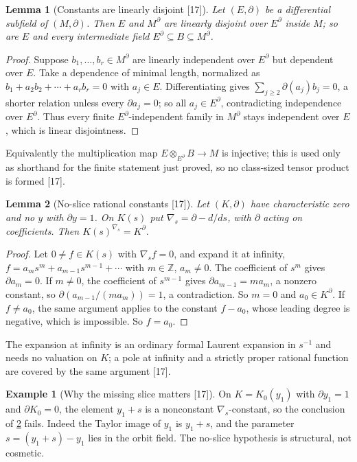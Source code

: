 \documentclass[11pt,oneside]{article}
\numberwithin{equation}{section}
\newtheorem{lemma}[lemma]{Lemma}
\theoremstyle{definition}
\newtheorem{example}[example]{Example}
\theoremstyle{remark}
\newcommand{\Z}{\mathbb Z}
\newcommand{\src}[1]{\textup{\textsf{\small[#1]}}}
\begin{document}
\begin{lemma}[Constants are linearly disjoint \src{17}]\label{opa:of:lem:LD}
Let $(E,\partial)$ be a differential subfield of $(M,\partial)$. Then $E$ and $M^\partial$ are linearly disjoint over $E^\partial$
inside $M$; so are $E$ and every intermediate field $E^\partial\subseteq B\subseteq M^\partial$.
\end{lemma}
\begin{proof}
Suppose $b_1,\dots,b_r\in M^\partial$ are linearly independent over $E^\partial$ but dependent over $E$. Take a dependence of
minimal length, normalized as $b_1+a_2b_2+\cdots+a_rb_r=0$ with $a_j\in E$. Differentiating gives $\sum_{j\ge2}\partial(a_j)b_j=0$,
a shorter relation unless every $\partial a_j=0$; so all $a_j\in E^\partial$, contradicting independence over $E^\partial$. Thus
every finite $E^\partial$-independent family in $M^\partial$ stays independent over $E$, which is linear disjointness.
\end{proof}

Equivalently the multiplication map $E\otimes_{E^\partial}B\to M$ is injective; this is used only as shorthand for the finite
statement just proved, so no class-sized tensor product is formed \src{17}.

\begin{lemma}[No-slice rational constants \src{17}]\label{opa:of:lem:addconstants}
Let $(K,\partial)$ have characteristic zero and no $y$ with $\partial y=1$. On $K(s)$ put $\nabla_{\!s}=\partial-d/ds$, with
$\partial$ acting on coefficients. Then $K(s)^{\nabla_{\!s}}=K^\partial$.
\end{lemma}
\begin{proof}
Let $0\ne f\in K(s)$ with $\nabla_{\!s}f=0$, and expand it at infinity, $f=a_ms^m+a_{m-1}s^{m-1}+\cdots$ with $m\in\Z$, $a_m\ne0$.
The coefficient of $s^m$ gives $\partial a_m=0$. If $m\ne0$, the coefficient of $s^{m-1}$ gives $\partial a_{m-1}=ma_m$, a nonzero
constant, so $\partial(a_{m-1}/(ma_m))=1$, a contradiction. So $m=0$ and $a_0\in K^\partial$. If $f\ne a_0$, the same argument
applies to the constant $f-a_0$, whose leading degree is negative, which is impossible. So $f=a_0$.
\end{proof}

The expansion at infinity is an ordinary formal Laurent expansion in $s^{-1}$ and needs no valuation on $K$; a pole at
infinity and a strictly proper rational function are covered by the same argument \src{17}.

\begin{example}[Why the missing slice matters \src{17}]\label{opa:of:ex:slice}
On $K=K_0(y_1)$ with $\partial y_1=1$ and $\partial K_0=0$, the element $y_1+s$ is a nonconstant $\nabla_{\!s}$-constant, so the
conclusion of \cref{opa:of:lem:addconstants} fails. Indeed the Taylor image of $y_1$ is $y_1+s$, and the parameter
$s=(y_1+s)-y_1$ lies in the orbit field. The no-slice hypothesis is structural, not cosmetic.
\end{example}
\end{document}
